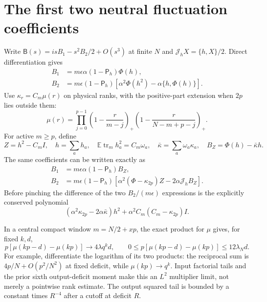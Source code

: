 \documentclass[11pt,a4paper]{article}
\newcommand{\EE}{\mathbb E}
\newcommand{\tr}{\operatorname{tr}}
\newcommand{\PP}{\mathsf P_h}
\newcommand{\BB}{\mathsf B}
\newcommand{\Jh}{\mathcal J_h}
\begin{document}
\section{The first two neutral fluctuation coefficients}
Write $\BB(s)=isB_1-s^2B_2/2+O(s^3)$ at finite $N$ and
$\Jh X=\{h,X\}/2$. Direct differentiation gives
\begin{align}
 B_1&=m\epsilon\alpha(1-\PP)\Phi(h),\\
 B_2&=m\epsilon(1-\PP)[\alpha^2\Phi(h^2)-\alpha\{h,\Phi(h)\}].
\end{align}
Use $\kappa_r=C_m\mu(r)$ on physical ranks, with the positive-part
extension when $2p$ lies outside them:
\begin{equation}
 \mu(r)=\prod_{j=0}^{p-1}
 \left(1-\frac r{m-j}\right)_+
 \left(1-\frac r{N-m+p-j}\right)_+.
\end{equation}
For active $m\ge p$, define
\begin{equation}
 Z=h^2-C_mI,\quad h=\sum_a h_a,\quad
 \EE\tr_m h_a^2=C_m\omega_a,\quad
 \bar\kappa=\sum_a\omega_a\kappa_a,\quad B_Z=\Phi(h)-\bar\kappa h.
\end{equation}
The same coefficients can be written exactly as
\begin{align}
 B_1&=m\epsilon\alpha(1-\PP)B_Z,\\
 B_2&=m\epsilon(1-\PP)
       [\alpha^2(\Phi-\kappa_{2p})Z-2\alpha\Jh B_Z].
 \label{eq:B2exact}
\end{align}
Before pinching the difference of the two $B_2/(m\epsilon)$
expressions is the explicitly conserved polynomial
\begin{equation}
 (\alpha^2\kappa_{2p}-2\alpha\bar\kappa)h^2
       +\alpha^2C_m(C_m-\kappa_{2p})I.
\end{equation}

In a central compact window $m=N/2+xp$, the exact product for
$\mu$ gives, for fixed $k,d$,
\begin{equation}
 p[\mu(kp-d)-\mu(kp)]\to4\lambda q^kd,\qquad
 0\le p[\mu(kp-d)-\mu(kp)]\le12\lambda_Nd.
 \label{eq:slope}
\end{equation}
For example, differentiate the logarithm of its two products:
the reciprocal sum is $4p/N+O(p^2/N^2)$ at fixed deficit,
while $\mu(kp)\to q^k$. Input factorial tails and the prior
sixth output-deficit moment \cite{Central,Raw} make this an
$L^2$ multiplier limit, not merely a pointwise rank estimate.
The output squared tail is bounded by a constant times $R^{-4}$
after a cutoff at deficit $R$.
\end{document}
